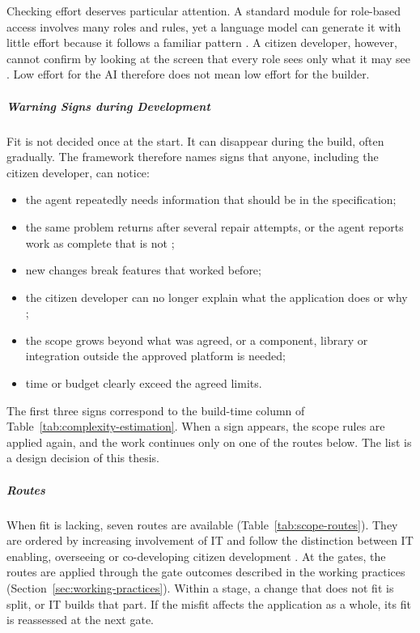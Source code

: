 \documentclass[10pt,a4paper]{article}
\begin{document}
Checking effort deserves particular attention. A standard module for
role-based access involves many roles and rules, yet a language model
can generate it with little effort because it follows a familiar
pattern \parencite{alaswad2026framework}. A citizen developer, however,
cannot confirm by looking at the screen that every role sees only what
it may see \parencite{kobiella2026}. Low effort for the AI therefore
does not mean low effort for the builder.

\subparagraph{Warning Signs during Development}

Fit is not decided once at the start. It can disappear during the
build, often gradually. The framework therefore names signs that
anyone, including the citizen developer, can notice:

\begin{itemize}
    \item the agent repeatedly needs information that should be in the
    specification;
    \item the same problem returns after several repair attempts, or
    the agent reports work as complete that is not
    \parencite{alhasan2026,uddin2026};
    \item new changes break features that worked before;
    \item the citizen developer can no longer explain what the
    application does or why \parencite{ginac2026};
    \item the scope grows beyond what was agreed, or a component,
    library or integration outside the approved platform is needed;
    \item time or budget clearly exceed the agreed limits.
\end{itemize}

The first three signs correspond to the build-time column of
Table~\ref{tab:complexity-estimation}. When a sign appears, the scope
rules are applied again, and the work continues only on one of the
routes below. The list is a design decision of this thesis.

\subparagraph{Routes}

When fit is lacking, seven routes are available
(Table~\ref{tab:scope-routes}). They are ordered by increasing
involvement of IT and follow the distinction between IT enabling,
overseeing or co-developing citizen development
\parencite{viljoen2024}. At the gates, the routes are applied through
the gate outcomes described in the working practices
(Section~\ref{sec:working-practices}). Within a stage, a change that
does not fit is split, or IT builds that part. If the misfit affects
the application as a whole, its fit is reassessed at the next gate.
\end{document}
